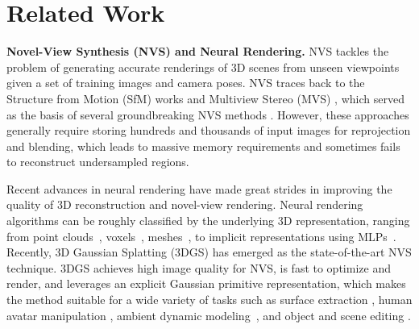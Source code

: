 \section{Related Work}

\noindent \textbf{Novel-View Synthesis (NVS) and Neural Rendering.} 
NVS tackles the problem of generating accurate renderings of 3D scenes from unseen viewpoints given a set of training images and camera poses. 
NVS traces back to the Structure from Motion (SfM) works \cite{snavely2026phototourism, Hartley2004sfm, brown2005unsupervised} and Multiview Stereo (MVS) \cite{seitz2006comparison, goesele2007multi, huang2018deepmvs}, which served as the basis of several groundbreaking NVS methods \cite{DeepBlending2018, eisemann2008floating, chaurasia2013depth, KPLD21point}. 
However, these approaches generally require storing hundreds and thousands of input images for reprojection and blending, which leads to massive memory requirements and sometimes fails to reconstruct undersampled regions. 

Recent advances in neural rendering \cite{tewari2022advances} have made great strides in improving the quality of 3D reconstruction and novel-view rendering. 
Neural rendering algorithms can be roughly classified by the underlying 3D representation, ranging from point clouds~\cite{KPLD21point, aliev2019point, xu2022point}, voxels~\cite{yu_and_fridovichkeil2021plenoxels, hu2023multiscale, yu2021plenoctrees}, meshes~\cite{neumesh, kato2018meshrenderer, Lombardi2018deepappearance, hu2021worldsheet, guo2023vmesh}, to implicit representations using MLPs~\cite{mildenhall2020nerf, mueller2022instant, sitzmann2019srns,attal2022learning}. 
Recently, 3D Gaussian Splatting \cite{kerbl3Dgaussians} (3DGS) has emerged as the state-of-the-art NVS technique. 
3DGS achieves high image quality for NVS, is fast to optimize and render, and leverages an explicit Gaussian primitive representation, which makes the method suitable for a wide variety of tasks such as surface extraction \cite{guedon2023sugar, Huang2DGS2024}, human avatar manipulation \cite{qian20233dgsavatar, shao2024splattingavatar}, ambient dynamic modeling~\cite{shih2024modeling}, and object and scene editing \cite{guedon2024frosting, gaussian_grouping}. 

